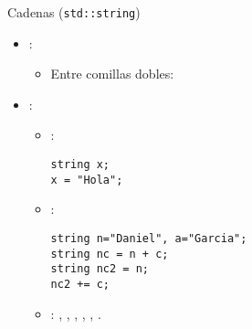 \begin{frame}[t,fragile]{Cadenas (\texttt{std::string})}
\begin{itemize}
  \item {}:
    \begin{itemize}
      \item Entre comillas dobles: 
    \end{itemize}

  \item {}:
    \begin{itemize}
      \item {}:
\begin{lstlisting}
string x;
x = "Hola";
\end{lstlisting}
      \item {}:
\begin{lstlisting}
string n="Daniel", a="Garcia";
string nc = n + c;
string nc2 = n;
nc2 += c;
\end{lstlisting}
      \item {}:
        \cppkey{==},
        \cppkey{!=},
        \cppkey{<},
        \cppkey{<=},
        \cppkey{>},
        \cppkey{>=}.
    \end{itemize}
\end{itemize}
\end{frame}

